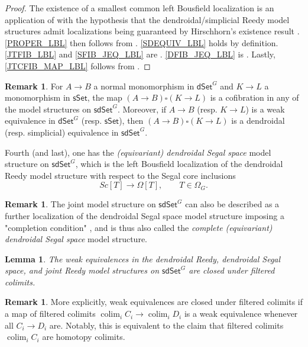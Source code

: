 \documentclass[a4paper,10pt
,draft
]{article}%
\numberwithin{equation}{section}
\numberwithin{figure}{section}
\newtheorem{lemma}[equation]{Lemma}%
\theoremstyle{definition} %
\newtheorem{remark}[equation]{Remark}%
\newcommand{\longto}{\longrightarrow}%
\DeclareMathOperator{\colim}{colim}%
\newcommand{\1}{\ensuremath{\mathbbm 1}}%
\begin{document}
\begin{proof}
	The existence of a smallest common left Bousfield localization is 
	an application of \cite[Prop. 4.1]{BP_edss}
	with the hypothesis that the dendroidal/simplicial Reedy model structures admit localizations being guaranteed by 
	Hirschhorn's existence result 
	\cite[Thm. 4.1.1]{Hir03}.
	\ref{PROPER_LBL} then follows from \cite[Thm. 4.1.1(3)]{Hir03}.
	\ref{SDEQUIV_LBL} holds by definition.
	\ref{JTFIB_LBL} and \ref{SFIB_JEQ_LBL} are \cite[Prop. 4.1(i)(ii)]{BP_edss}.
	\ref{DFIB_JEQ_LBL} is \cite[Cor. 4.29(iii)]{BP_edss}.
	Lastly, \ref{JTCFIB_MAP_LBL} follows from \cite[Lemmas A.27(i), A.29(i)]{BP_edss}.
\end{proof}


\begin{remark}\label{SQUAREEQUI REM}
	For $A \to B$ a normal monomorphism in $\mathsf{dSet}^G$
	and $K\to L$ a monomorphism in $\mathsf{sSet}$,
	the map $(A\to B) \square (K\to L)$
	is a cofibration in any of the model structures on $\mathsf{sdSet}^G$.
	Moreover, if $A\to B$ (resp. $K\to L$)
	is a weak equivalence in $\mathsf{dSet}^G$ (resp. $\mathsf{sSet}$),
	then $(A\to B) \square (K\to L)$ is a 
	dendroidal (resp. simplicial)
	equivalence in $\mathsf{sdSet}^G$.
\end{remark}



Fourth (and last), one has the \textit{(equivariant) dendroidal Segal space} model structure on $\mathsf{sdSet}^G$,
which is the left Bousfield localization of the dendroidal Reedy model structure with respect to the Segal core inclusions
\[
	Sc[T] \longto \Omega[T],
\qquad
	T \in \Omega_G.
\]


\begin{remark}
	The joint model structure on
	$\mathsf{sdSet}^G$
	can also be described as a further localization of the 
	dendroidal Segal space model structure
	imposing a "completion condition"
	\cite[Rem. 4.27]{BP_edss},
	and is thus also called the 
	\emph{complete (equivariant) dendroidal Segal space}
	model structure.
\end{remark}


\begin{lemma}\label{FCOLIM_WE_LEM}
	The weak equivalences in the dendroidal Reedy, dendroidal Segal space, and joint Reedy model structures 
	on $\mathsf{sdSet}^G$ are closed under filtered colimits.
\end{lemma}


\begin{remark}\label{WEFILRES REM}
	More explicitly, weak equivalences are closed
	under filtered colimits if a map of filtered colimits
	$\colim_i C_i \to \colim_i D_i$
	is a weak equivalence whenever all $C_i \to D_i$ are.
%	
	Notably, this is 
	equivalent to 
	the claim that filtered colimits
	$\colim_i C_i$ are homotopy colimits.
\end{remark}
\end{document}
